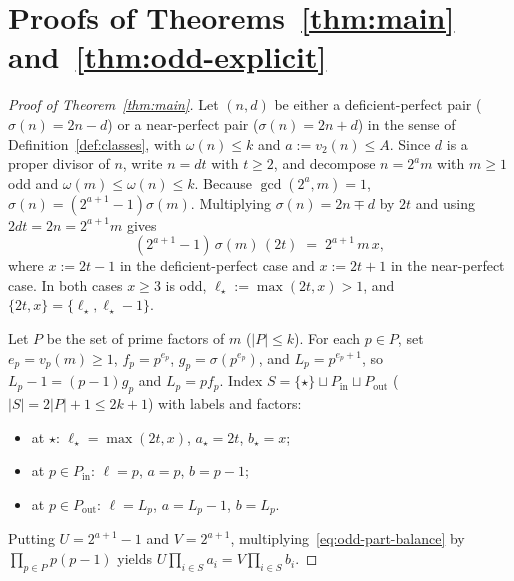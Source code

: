 \documentclass[11pt]{amsart}
\theoremstyle{definition}
\theoremstyle{remark}
\begin{document}
\section{Proofs of Theorems~\ref{thm:main} and~\ref{thm:odd-explicit}}

\begin{proof}[Proof of Theorem~\ref{thm:main}]
Let $(n, d)$ be either a deficient-perfect pair ($\sigma(n) = 2n - d$) or a near-perfect pair ($\sigma(n) = 2n + d$) in the sense of Definition~\ref{def:classes}, with $\omega(n) \le k$ and $a := v_2(n) \le A$. Since $d$ is a proper divisor of $n$, write $n = d t$ with $t \ge 2$, and decompose $n = 2^a m$ with $m \ge 1$ odd and $\omega(m) \le \omega(n) \le k$. Because $\gcd(2^a, m) = 1$, $\sigma(n) = (2^{a+1} - 1)\sigma(m)$. Multiplying $\sigma(n) = 2n \mp d$ by $2t$ and using $2dt = 2n = 2^{a+1} m$ gives
\begin{equation}\label{eq:odd-part-balance}
  (2^{a+1} - 1)\,\sigma(m)\,(2t) \;=\; 2^{a+1}\, m\, x,
\end{equation}
where $x := 2t - 1$ in the deficient-perfect case and $x := 2t + 1$ in the near-perfect case. In both cases $x \ge 3$ is odd, $\ell_\star := \max(2t, x) > 1$, and $\{2t, x\} = \{\ell_\star, \ell_\star - 1\}$.

Let $P$ be the set of prime factors of $m$ ($|P| \le k$). For each $p \in P$, set $e_p = v_p(m) \ge 1$, $f_p = p^{e_p}$, $g_p = \sigma(p^{e_p})$, and $L_p = p^{e_p + 1}$, so $L_p - 1 = (p - 1) g_p$ and $L_p = p f_p$. Index $S = \{\star\} \sqcup P_{\mathrm{in}} \sqcup P_{\mathrm{out}}$ ($|S| = 2|P| + 1 \le 2k + 1$) with labels and factors:
\begin{itemize}
  \item at $\star$: $\ell_\star = \max(2t, x)$, $a_\star = 2t$, $b_\star = x$;
  \item at $p \in P_{\mathrm{in}}$: $\ell = p$, $a = p$, $b = p - 1$;
  \item at $p \in P_{\mathrm{out}}$: $\ell = L_p$, $a = L_p - 1$, $b = L_p$.
\end{itemize}
Putting $U = 2^{a+1} - 1$ and $V = 2^{a+1}$, multiplying~\eqref{eq:odd-part-balance} by $\prod_{p \in P} p(p - 1)$ yields $U \prod_{i \in S} a_i = V \prod_{i \in S} b_i$.


\end{proof}
\end{document}
